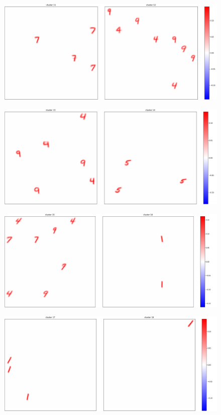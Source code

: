 \documentclass[a4paper]{report}
\begin{document}
\begin{figure} [H]
    \centering
    \includegraphics [width=\textwidth ] {c/c/11.png}
    \caption{}
\end{figure}

\begin{figure} [H]
	\centering
	\includegraphics [width=\textwidth ] {c/c/13.png}
	\caption{}
\end{figure}

\begin{figure} [H]
	\centering
	\includegraphics [width=\textwidth ] {c/c/15.png}
	\caption{}
\end{figure}

\begin{figure} [H]
	\centering
	\includegraphics [width=\textwidth ] {c/c/17.png}
	\caption{}
\end{figure}
\end{document}
